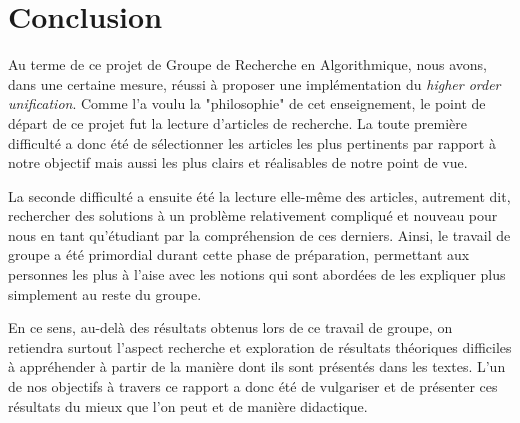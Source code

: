 \section{Conclusion}

Au terme de ce projet de Groupe de Recherche en Algorithmique, nous avons, dans une certaine mesure, réussi à proposer une implémentation du \textit{higher order unification}. Comme l'a voulu la "philosophie" de cet enseignement, le point de départ de ce projet fut la lecture d'articles de recherche. La toute première difficulté a donc été de sélectionner les articles les plus pertinents par rapport à notre objectif mais aussi les plus clairs et réalisables de notre point de vue. 

La seconde difficulté a ensuite été la lecture elle-même des articles, autrement dit, rechercher des solutions à un problème relativement compliqué et nouveau pour nous en tant qu'étudiant par la compréhension de ces derniers. Ainsi, le travail de groupe a été primordial durant cette phase de préparation, permettant aux personnes les plus à l'aise avec les notions qui sont abordées de les expliquer plus simplement au reste du groupe.

En ce sens, au-delà des résultats obtenus lors de ce travail de groupe, on retiendra surtout l'aspect recherche et exploration de résultats théoriques difficiles à appréhender à partir de la manière dont ils sont présentés dans les textes. L'un de nos objectifs à travers ce rapport a donc été de vulgariser et de présenter ces résultats du mieux que l'on peut et de manière didactique.